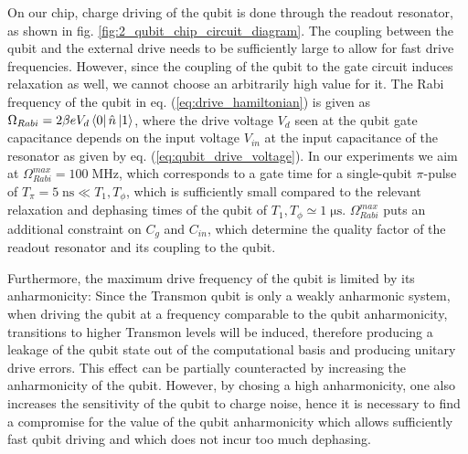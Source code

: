 On our chip, charge driving of the qubit is done through the readout resonator, as shown in fig. \ref{fig:2_qubit_chip_circuit_diagram}. The coupling between the qubit and the external drive needs to be sufficiently large to allow for fast drive frequencies. However, since the coupling of the qubit to the gate circuit induces relaxation as well, we cannot choose an arbitrarily high value for it. The Rabi frequency of the qubit in eq. (\ref{eq:drive_hamiltonian}) is given as $\Omega_{Rabi}= 2 \beta e V_d \left< 0 \right|\hat{n}\left| 1 \right>$, where the drive voltage $V_d$ seen at the qubit gate capacitance depends on the input voltage $V_{in}$ at the input capacitance of the resonator as given by eq. (\ref{eq:qubit_drive_voltage}). In our experiments we aim at $\Omega_{Rabi}^{max}=100\;\mathrm{MHz}$, which corresponds to a gate time for a single-qubit $\pi$-pulse of $T_\pi=5\;\mathrm{ns}\ll T_1,T_\phi$, which is sufficiently small compared to the relevant relaxation and dephasing times of the qubit of $T_1,T_\phi\simeq 1\;\mathrm{\mu s}$. $\Omega_{Rabi}^{max}$ puts an additional constraint on $C_{g}$ and $C_{in}$, which determine the quality factor of the readout resonator and its coupling to the qubit.

\smallskip	

Furthermore, the maximum drive frequency of the qubit is limited by its anharmonicity: Since the Transmon qubit is only a weakly anharmonic system, when driving the qubit at a frequency comparable to the qubit anharmonicity, transitions to higher Transmon levels will be induced, therefore producing a leakage of the qubit state out of the computational basis and producing unitary drive errors. This effect can be partially counteracted by increasing the anharmonicity of the qubit. However, by chosing a high anharmonicity, one also increases the sensitivity of the qubit to charge noise, hence it is necessary to find a compromise for the value of the qubit anharmonicity which allows sufficiently fast qubit driving and which does not incur too much dephasing.

\smallskip

